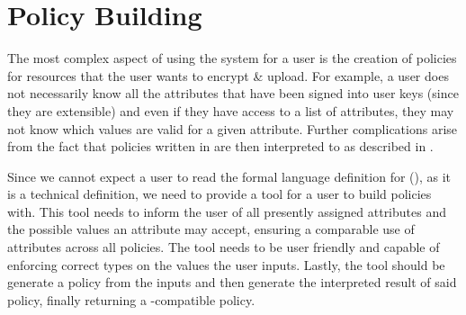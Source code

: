 \section{Policy Building}
\label{sec:design_pol_build}

The most complex aspect of using the \theResServer system for a user is the creation of policies for resources that the user wants to encrypt \& upload. For example, a user does not necessarily know all the attributes that have been signed into user keys (since they are extensible) and even if they have access to a list of attributes, they may not know which values are valid for a given attribute. Further complications arise from the fact that policies written in \thePolicyLang are then interpreted to \PyOpenABE as described in .

Since we cannot expect a user to read the formal language definition for \thePolicyLang (), as it is a technical definition, we need to provide a tool for a user to build policies with. This tool needs to inform the user of all presently assigned attributes and the possible values an attribute may accept, ensuring a comparable use of attributes across all policies. The tool needs to be user friendly and capable of enforcing correct types on the values the user inputs. Lastly, the tool should be generate a \thePolicyLang policy from the inputs and then generate the interpreted result of said \thePolicyLang policy, finally returning a \PyOpenABE-compatible policy.

